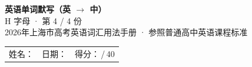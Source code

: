 \documentclass[10pt,a4paper]{article}
\begin{document}
\pagestyle{plain}

\begin{center}
{\LARGE\bfseries 英语单词默写（英 $\to$ 中）}\\[0.22em]
{\large H 字母 · 第 4 / 4 份}\\[0.18em]
{\small 2026年上海市高考英语词汇用法手册 · 参照普通高中英语课程标准}
\end{center}

\vspace{0.25em}
\noindent\begin{tabular}{@{}p{}@{}p{}@{}p{}@{}}
姓名：\underline{\hspace{2.0cm}} & 日期：\underline{\hspace{2.0cm}} & 得分：\underline{\hspace{1.3cm}}\,/\,40 \\
\end{tabular}

\vspace{0.3em}

\vspace{0.08em}
\end{document}
